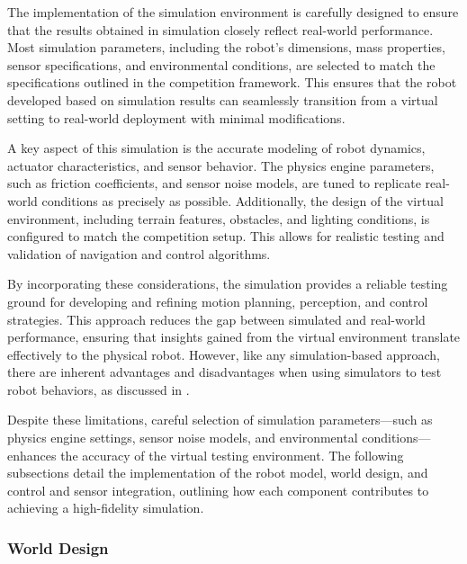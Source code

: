 \documentclass[../../main]{subfiles}
\begin{document}
The implementation of the simulation environment is carefully designed to ensure that the 
results obtained in simulation closely reflect real-world performance. Most simulation 
parameters, including the robot’s dimensions, mass properties, sensor specifications, 
and environmental conditions, are selected to match the specifications outlined in the 
competition framework. This ensures that the robot developed based on simulation 
results can seamlessly transition from a virtual setting to real-world deployment with 
minimal modifications.  

A key aspect of this simulation is the accurate modeling of robot dynamics, actuator 
characteristics, and sensor behavior. The physics engine parameters, such as friction 
coefficients, and sensor noise models, are tuned to replicate real-world 
conditions as precisely as possible. Additionally, the design of the virtual environment, 
including terrain features, obstacles, and lighting conditions, is configured to match 
the competition setup. This allows for realistic testing and validation of navigation 
and control algorithms.  

By incorporating these considerations, the simulation provides a reliable testing ground 
for developing and refining motion planning, perception, and control strategies. This 
approach reduces the gap between simulated and real-world performance, ensuring that 
insights gained from the virtual environment translate effectively to the physical robot. 
However, like any simulation-based approach, there are inherent advantages and 
disadvantages when using simulators to test robot behaviors, as discussed in \cite{lera2014mobile}. 

Despite these limitations, careful selection of simulation parameters---such as physics 
engine settings, sensor noise models, and environmental conditions---enhances the accuracy 
of the virtual testing environment. The following subsections detail the implementation 
of the robot model, world design, and control and sensor integration, outlining how each 
component contributes to achieving a high-fidelity simulation.

\subsubsection{World Design} 
\end{document}
